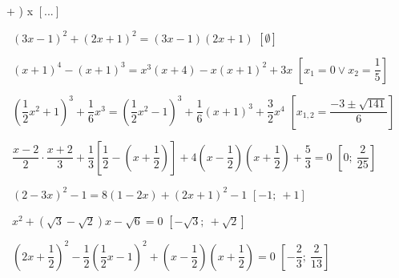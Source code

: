 \begin{esercizio}[\Ast]
\begin{enumeratea}
+ \right) x\)
  \hfill\(\left[...\right]\)
 \item~\((3 x-1)^{2} + (2 x + 1)^{2} = (3 x-1) (2 x + 1)\)
  \hfill\(\left[\emptyset\right]\)
 \item~\((x + 1)^{4}-(x + 1)^{3} = x^{3} (x + 4)-x (x + 1)^{2} + 3 x\)
  \hfill\(\left[x_{1} = 0 \vee x_{2} = \dfrac{1}{5}\right]\)
 \item~\(\left(\dfrac{1}{2} x^{2} + 1 \right)^{3} + \dfrac{1}{6} x^{3} = 
\left(\dfrac{1}{2} x^{2}-1 \right)^{3} + \dfrac{1}{6} (x + 1)^{3} + 
\dfrac{3}{2} x^{4}\)
  \hfill\(\left[x_{1,2} = \dfrac{- 3 \pm \sqrt{141}}{6}\right]\)
 \item~\(\dfrac{x-2}{2} \cdot \dfrac{x + 2}{3} + \dfrac{1}{3} 
\left[\dfrac{1}{2}-\left(x + \dfrac{1}{2} \right) \right] + 4 \left(x 
-\dfrac{1}{2} 
\right) \left(x + \dfrac{1}{2} \right) + \dfrac{5}{3} = 0\)
  \hfill\(\left[0;~\dfrac{2}{25}\right]\)
 \item~\((2-3 x)^{2}-1 = 8 (1-2 x) + (2 x + 1)^{2}-1\)
  \hfill\(\left[-1;~+1\right]\)
 \item~\(x^{2} + \left(\sqrt{3}-\sqrt{2} \right) x-\sqrt{6} = 0\)
  \hfill\(\left[-\sqrt{3};~ + \sqrt{2}\right]\)
 \item~\(\left(2 x + \dfrac{1}{2} \right)^{2}-\dfrac{1}{2} 
        \left(\dfrac{1}{2} x-1 \right)^{2} + \left(x-\dfrac{1}{2} \right) 
        \left(x + \dfrac{1}{2} \right) = 0\)
  \hfill\(\left[-\dfrac{2}{3};~\dfrac{2}{13}\right]\)
 \end{enumeratea}
\end{esercizio}

